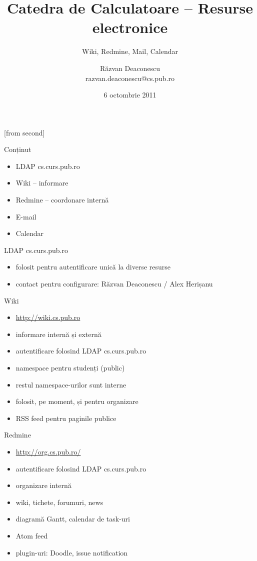\documentclass{beamer}
\title[CSE Tools]{Catedra de Calculatoare -- Resurse electronice}
\subtitle{Wiki, Redmine, Mail, Calendar}
\institute{Catedra de Calculatoare}
\author[Răzvan Deaconescu]{Răzvan Deaconescu\\
      razvan.deaconescu@cs.pub.ro}
\date{6 octombrie 2011}
\begin{document}
[from second]

\frame{\titlepage}

\begin{frame}{Conținut}
  \begin{itemize}
    \item LDAP cs.curs.pub.ro
    \item Wiki -- informare
    \item Redmine -- coordonare internă
    \item E-mail
    \item Calendar
  \end{itemize}
\end{frame}

\begin{frame}{LDAP cs.curs.pub.ro}
  \begin{itemize}
    \item folosit pentru autentificare unică la diverse resurse
    \item contact pentru configurare: Răzvan Deaconescu / Alex Herișanu
  \end{itemize}
\end{frame}

\begin{frame}{Wiki}
  \begin{itemize}
    \item \url{http://wiki.cs.pub.ro}
    \item informare internă și externă
    \item autentificare folosind LDAP cs.curs.pub.ro
    \item namespace pentru studenți (public)
    \item restul namespace-urilor sunt interne
    \item folosit, pe moment, și pentru organizare
    \item RSS feed pentru paginile publice
  \end{itemize}
\end{frame}

\begin{frame}{Redmine}
  \begin{itemize}
    \item \url{http://org.cs.pub.ro/}
    \item autentificare folosind LDAP cs.curs.pub.ro
    \item organizare internă
    \item wiki, tichete, forumuri, news
    \item diagramă Gantt, calendar de task-uri
    \item Atom feed
    \item plugin-uri: Doodle, issue notification
  \end{itemize}
\end{frame}
\end{document}
